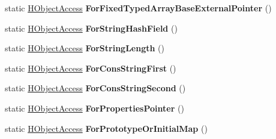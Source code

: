 \begin{DoxyCompactItemize}
\item 
static \hyperlink{classv8_1_1internal_1_1_h_object_access}{H\+Object\+Access} {\bfseries For\+Fixed\+Typed\+Array\+Base\+External\+Pointer} ()\hypertarget{classv8_1_1internal_1_1_h_object_access_a94baca94faf33312126fde165357f8af}{}\label{classv8_1_1internal_1_1_h_object_access_a94baca94faf33312126fde165357f8af}

\item 
static \hyperlink{classv8_1_1internal_1_1_h_object_access}{H\+Object\+Access} {\bfseries For\+String\+Hash\+Field} ()\hypertarget{classv8_1_1internal_1_1_h_object_access_a9f9f924bfb1c0153da4778ef8bf17600}{}\label{classv8_1_1internal_1_1_h_object_access_a9f9f924bfb1c0153da4778ef8bf17600}

\item 
static \hyperlink{classv8_1_1internal_1_1_h_object_access}{H\+Object\+Access} {\bfseries For\+String\+Length} ()\hypertarget{classv8_1_1internal_1_1_h_object_access_a781d721d02fdcdd43c436f8a44fbdaed}{}\label{classv8_1_1internal_1_1_h_object_access_a781d721d02fdcdd43c436f8a44fbdaed}

\item 
static \hyperlink{classv8_1_1internal_1_1_h_object_access}{H\+Object\+Access} {\bfseries For\+Cons\+String\+First} ()\hypertarget{classv8_1_1internal_1_1_h_object_access_ac4b5083e94f29f0a310cb95a96dbada5}{}\label{classv8_1_1internal_1_1_h_object_access_ac4b5083e94f29f0a310cb95a96dbada5}

\item 
static \hyperlink{classv8_1_1internal_1_1_h_object_access}{H\+Object\+Access} {\bfseries For\+Cons\+String\+Second} ()\hypertarget{classv8_1_1internal_1_1_h_object_access_a29da1dc0bcc05666a112ce8e0cde3c63}{}\label{classv8_1_1internal_1_1_h_object_access_a29da1dc0bcc05666a112ce8e0cde3c63}

\item 
static \hyperlink{classv8_1_1internal_1_1_h_object_access}{H\+Object\+Access} {\bfseries For\+Properties\+Pointer} ()\hypertarget{classv8_1_1internal_1_1_h_object_access_a983bc8ca3377268253d1de84ce554d5e}{}\label{classv8_1_1internal_1_1_h_object_access_a983bc8ca3377268253d1de84ce554d5e}

\item 
static \hyperlink{classv8_1_1internal_1_1_h_object_access}{H\+Object\+Access} {\bfseries For\+Prototype\+Or\+Initial\+Map} ()\hypertarget{classv8_1_1internal_1_1_h_object_access_a79340d44e7f75fb2e5dbdbd132fc0a88}{}\label{classv8_1_1internal_1_1_h_object_access_a79340d44e7f75fb2e5dbdbd132fc0a88}


\end{DoxyCompactItemize}
